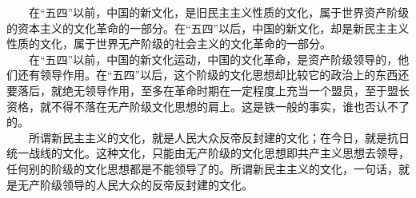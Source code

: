 \documentclass[cn,11pt,chinese]{elegantbook}
\begin{document}
　　在“五四”以前，中国的新文化，是旧民主主义性质的文化，属于世界资产阶级的资本主义的文化革命的一部分。在“五四”以后，中国的新文化，却是新民主主义性质的文化，属于世界无产阶级的社会主义的文化革命的一部分。\\
　　在“五四”以前，中国的新文化运动，中国的文化革命，是资产阶级领导的，他们还有领导作用。在“五四”以后，这个阶级的文化思想却比较它的政治上的东西还要落后，就绝无领导作用，至多在革命时期在一定程度上充当一个盟员，至于盟长资格，就不得不落在无产阶级文化思想的肩上。这是铁一般的事实，谁也否认不了的。\\
　　所谓新民主主义的文化，就是人民大众反帝反封建的文化；在今日，就是抗日统一战线的文化。这种文化，只能由无产阶级的文化思想即共产主义思想去领导，任何别的阶级的文化思想都是不能领导了的。所谓新民主主义的文化，一句话，就是无产阶级领导的人民大众的反帝反封建的文化。\\
\end{document}
